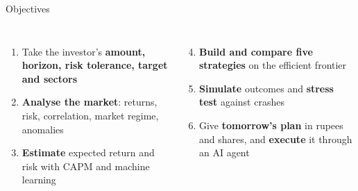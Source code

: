 \documentclass[aspectratio=169,11pt]{beamer}
\begin{document}
\begin{frame}{Objectives}
  \vspace{0.3cm}
  \begin{columns}[T]
      \begin{enumerate}\setlength{\itemsep}{9pt}
        \item Take the investor's \textbf{amount, horizon, risk tolerance, target and sectors}
        \item \textbf{Analyse the market}: returns, risk, correlation, market regime, anomalies
        \item \textbf{Estimate} expected return and risk with CAPM and machine learning
      \end{enumerate}
      \begin{enumerate}\setcounter{enumi}{3}\setlength{\itemsep}{9pt}
        \item \textbf{Build and compare five strategies} on the efficient frontier
        \item \textbf{Simulate} outcomes and \textbf{stress test} against crashes
        \item Give \textbf{tomorrow's plan} in rupees and shares, and \textbf{execute} it through an AI agent
      \end{enumerate}
  \end{columns}
\end{frame}
\end{document}

